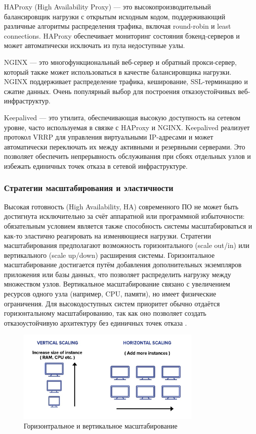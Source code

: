 HAProxy (High Availability Proxy) — это высокопроизводительный балансировщик нагрузки с открытым исходным кодом, поддерживающий различные алгоритмы распределения трафика, включая round-robin и least connections. HAProxy обеспечивает мониторинг состояния бэкенд-серверов и может автоматически исключать из пула недоступные узлы.

NGINX — это многофункциональный веб-сервер и обратный прокси-сервер, который также может использоваться в качестве балансировщика нагрузки. NGINX поддерживает распределение трафика, кеширование, SSL-терминацию и сжатие данных. Очень популярный выбор для построения отказоустойчивых веб-инфраструктур.

Keepalived — это утилита, обеспечивающая высокую доступность на сетевом уровне, часто используемая в связке с HAProxy и NGINX. Keepalived реализует протокол VRRP для управления виртуальными IP-адресами и может автоматически переключать их между активными и резервными серверами. Это позволяет обеспечить непрерывность обслуживания при сбоях отдельных узлов и избежать единичных точек отказа в сетевой инфраструктуре.

\subsubsection{Стратегии масштабирования и эластичности}

Высокая готовность (High Availability, HA) современного ПО не может быть достигнута исключительно за счёт аппаратной или программной избыточности: обязательным условием является также способность системы масштабироваться и как-то эластично реагировать на изменяющиеся нагрузки.
Стратегии масштабирования предполагают возможность горизонтального (scale out/in) или вертикального (scale up/down) расширения системы. Горизонтальное масштабирование достигается путём добавления дополнительных экземпляров приложения или базы данных, что позволяет распределить нагрузку между множеством узлов. Вертикальное масштабирование связано с увеличением ресурсов одного узла (например, CPU, памяти), но имеет физические ограничения. Для высокодоступных систем приоритет обычно отдаётся горизонтальному масштабированию, так как оно позволяет создать отказоустойчивую архитектуру без единичных точек отказа \autocite{AvailMashtab}.

\begin{figure}[h]
    \centering
    \includegraphics[width=0.8\textwidth]{assets/ScalingAvail.png}
    \caption{Горизонтральное и вертикальное масштабирование}
    \label{fig:Scaling1}
\end{figure}


